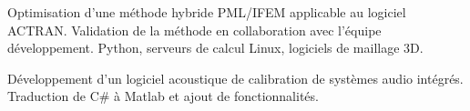 \documentclass[10pt,a4paper]{altacv}
\begin{document}
Optimisation d'une m\'ethode hybride PML/IFEM applicable au logiciel ACTRAN.\linebreak
Validation de la m\'ethode en collaboration avec l'\'equipe d\'eveloppement. Python, serveurs de calcul Linux, logiciels de maillage 3D.
\divider

D\'eveloppement d'un logiciel acoustique de calibration de syst\`emes audio int\'egr\'es. Traduction de C\# \`a
Matlab et ajout de fonctionnalit\'es.

\clearpage
\end{document}
